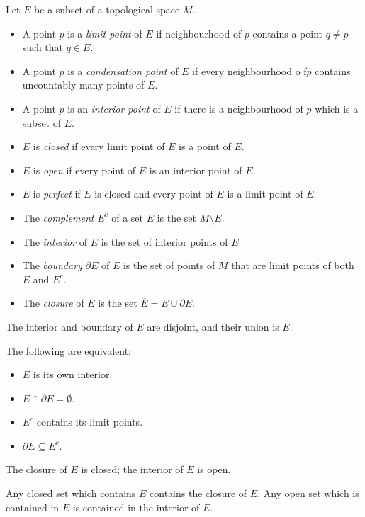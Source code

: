 \begin{defn}
  Let $E$ be a subset of a topological space $M$.
  \begin{itemize}
    \item A point $p$ is a \emph{limit point} of $E$ if neighbourhood of $p$
      contains a point $q\ne p$ such that $q\in E$.
  \item A point $p$ is a \emph{condensation point} of $E$ if every neighbourhood
      o f$p$ contains uncountably many points of $E$.
    \item A point $p$ is an \emph{interior point} of $E$ if there is a
        neighbourhood of $p$ which is a subset of $E$.
    \item $E$ is \emph{closed} if every limit point of $E$ is a point of $E$.
    \item $E$ is \emph{open} if every point of $E$ is an interior point of $E$.
    \item $E$ is \emph{perfect} if $E$ is closed and every point of $E$ is a
        limit point of $E$.
    \item The \emph{complement} $E^c$ of a set $E$ is the set $M\setminus E$.
    \item The \emph{interior} of $E$ is the set of interior points of $E$.
    \item The \emph{boundary} $\partial E$ of $E$ is the set of points of $M$
      that are limit points of both $E$ and $E^c$.
  \item The \emph{closure} of $E$ is the set $\overline E=E\cup\partial E$.
  \end{itemize}
\end{defn}
\begin{prop}
  The interior and boundary of $E$ are disjoint, and their union is $E$.
\end{prop}
\begin{prop}
  The following are equivalent:
  \begin{itemize}
    \item $E$ is its own interior.
    \item $E\cap\partial E=\emptyset$.
    \item $E^c$ contains its limit points.
    \item $\partial E\subseteq E^c$.
  \end{itemize}
\end{prop}
\begin{prop}
  The closure of $E$ is closed; the interior of $E$ is open.

  Any closed set which contains $E$ contains the closure of $E$. Any open set
  which is contained in $E$ is contained in the interior of $E$.
\end{prop}

